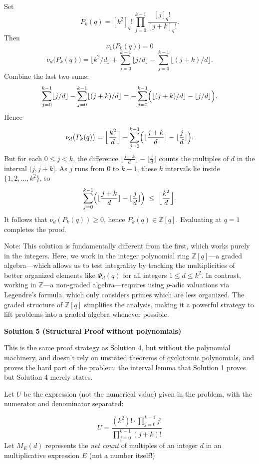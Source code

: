 \begin{enumerate}
 Set
 \[P_k(q) = [k^2]_q!\,\prod_{j=0}^{k-1}\frac{[j]_q!}{[j+k]_q!}.\]Then
 \[\nu_1\bigl(P_k(q)\bigr) = 0\]
 \[\nu_d\bigl(P_k(q)\bigr) = \lfloor k^2/d\rfloor + \sum_{j=0}^{k-1}\lfloor j/d\rfloor - \sum_{j=0}^{k-1}\lfloor (j+k)/d\rfloor.\]Combine the last two sums:
 \[\sum_{j=0}^{k-1}\lfloor j/d\rfloor - \sum_{j=0}^{k-1}\lfloor (j+k)/d\rfloor = -\sum_{j=0}^{k-1}\Bigl(\lfloor (j+k)/d\rfloor - \lfloor j/d\rfloor\Bigr).\]Hence
 \[\nu_d\bigl(P_k(q)\bigr) = \Big\lfloor\frac{k^2}{d}\Big\rfloor - \sum_{j=0}^{k-1}\Bigl(\lfloor\frac{j+k}{d}\rfloor - \lfloor\frac{j}{d}\rfloor\Bigr).\]But for each $0\le j<k$, the difference $\lfloor\frac{j+k}{d}\rfloor - \lfloor\frac{j}{d}\rfloor$ counts the multiples of $d$ in the interval $(j,j+k]$.  As $j$ runs from $0$ to $k-1$, these $k$ intervals lie inside $\{1,2,\dots,k^2\}$, so
 \[\sum_{j=0}^{k-1}\Bigl(\lfloor\frac{j+k}{d}\rfloor - \lfloor\frac{j}{d}\rfloor\Bigr) \;\le\; \Big\lfloor\frac{k^2}{d}\Big\rfloor.\]It follows that $\nu_d(P_k(q))\ge0$, hence $P_k(q)\in\mathbb{Z}[q]$.  Evaluating at $q=1$ completes the proof.

 Note: This solution is fundamentally different from the first, which works purely in the integers. Here, we work in the integer polynomial ring $\mathbb{Z}[q]$—a graded algebra—which allows us to test integrality by tracking the multiplicities of better organized elements like $\Phi_d(q)$ for all integers $1 \le d \le k^2$. In contrast, working in $\mathbb{Z}$—a non-graded algebra—requires using $p$-adic valuations via Legendre’s formula, which only considers primes which are less organized. The graded structure of $\mathbb{Z}[q]$ simplifies the analysis, making it a powerful strategy to lift problems into a graded algebra whenever possible.

 



\textbf{Solution 5 (Structural Proof without polynomials)}

This is the same proof strategy as Solution 4, but without the polynomial machinery, and doesn't rely on unstated theorems of \href{https://artofproblemsolving.com/wiki/index.php?title=Cyclotomic\_polynomial}{cyclotomic polynomials}, and proves the hard part of the problem: the interval lemma that Solution 1 proves but Solution 4 merely states.

 Let $U$ be the expression (not the numerical value) given in the problem, with the numerator and denominator separated:

 
 \[U = \frac{(k^2)! \cdot \prod_{j=0}^{k-1} j!}{\prod_{j=0}^{k-1} (j+k)!}\]Let $M_E(d)$ represents the \textit{net count} of multiples of an integer $d$ in an multiplicative expression $E$ (not a number itself!)


\end{enumerate}
